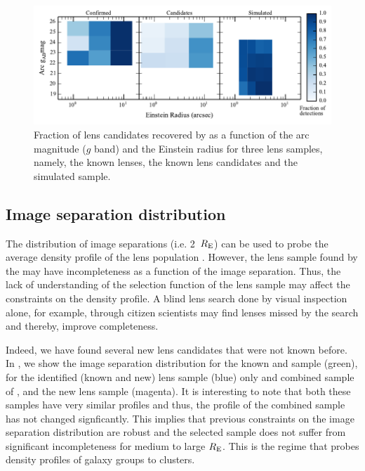 \documentclass[useAMS,usenatbib,a4paper]{mn2e}
\begin{document}
\begin{figure}
\begin{center}
\includegraphics[scale=1.0]{sw-cfhtls-figs/comp_reinst_mag.pdf}
\caption{ \label{fig:compre} Fraction of lens candidates recovered by \sw as a
function of the arc magnitude ($g$ band) and the Einstein radius for three lens
samples, namely, the known lenses, the known lens candidates and the simulated
sample. }
\end{center}
\end{figure}


\subsection{Image separation distribution}
\label{sec:results:isd}

The distribution of image separations (i.e. 2~$R_{\rm E}$)
can be used to probe the average density profile of the lens population
\citep{Oguri2006,More2012}.  However, the lens sample found by the \af
may have incompleteness as a function of the image separation. Thus, the
lack of understanding of the selection function of the lens sample may
affect the constraints on the density profile. A blind lens search done
by visual inspection alone, for example, through \sw citizen scientists may find
lenses missed by the \af search and thereby, improve completeness.

Indeed, we have found several new lens candidates that were not known
before. In , we show the image separation distribution for
the known \rf and \af sample (green), for the \sw identified (known and
new) lens sample (blue) only and combined \cfhtls sample of \rf, \af and
the new \sw lens sample (magenta). It is interesting to note that both
these samples have very similar profiles and thus, the profile of the
combined sample has not changed signficantly. This implies that previous
constraints on the image separation distribution are robust and the \af
selected sample does not suffer from significant incompleteness for
medium to large $R_{\rm E}$. This is the regime that probes density
profiles of galaxy groups to clusters.
\end{document}
